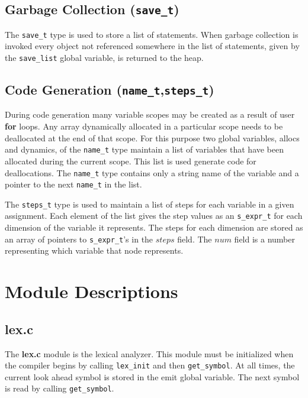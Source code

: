 \subsection{Garbage Collection ({\tt save\_t})}
The {\tt save\_t} type is used to store a list of statements.  When garbage 
collection is invoked every object not referenced somewhere in the list
of statements, given by the {\tt save\_list} global variable, is returned to the
heap.

\subsection{Code Generation ({\tt name\_t},{\tt steps\_t})}
During code generation many variable scopes may be created as a result of 
user {\bf for} loops.  Any array dynamically allocated in a particular
scope needs to be deallocated at the end of that scope.  For this purpose two
global variables, allocs and dynamics, of the {\tt name\_t} type maintain a list of
variables that have been allocated during the current scope.  This list is
used generate code for deallocations.  The {\tt name\_t} type contains only a
string name of the variable and a pointer to the next {\tt name\_t} in the list.

The {\tt steps\_t} type is used to maintain a list of steps for each variable in
a given assignment.  Each element of the list gives the step values as an
{\tt s\_expr\_t} for each dimension of the variable it represents.  The
steps for each dimension are stored as an array of pointers to {\tt s\_expr\_t}'s in
the $steps$ field.  The $num$ field is a number representing which variable
that node represents.

\section{Module Descriptions}
\subsection{{\bf lex.c}}
The {\bf lex.c} module is the lexical analyzer.  This module must be initialized
when the compiler begins by calling {\tt lex\_init} and then {\tt get\_symbol}.  At
all times, the current look ahead symbol is stored in the emit global variable.
The next symbol is read by calling {\tt get\_symbol}.

